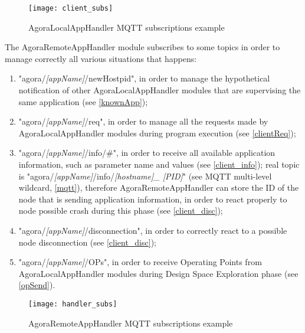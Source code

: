 \begin{figure}[H]

    \centering
    \texttt{[image: client\_subs]}
    \caption{AgoraLocalAppHandler MQTT subscriptions example}
    
\end{figure}

The AgoraRemoteAppHandler module subscribes to some topics in order to manage correctly all various situations that happens:

\begin{enumerate}

    \item "agora/\textit{[appName]}/newHostpid", in order to manage the hypothetical notification of other AgoraLocalAppHandler modules that are supervising the same application (see \ref{knownApp});
    
    \item "agora/\textit{[appName]}/req", in order to manage all the requests made by AgoraLocalAppHandler modules during program execution (see \ref{clientReq});
    
    \item "agora/\textit{[appName]}/info/\#", in order to receive all available application information, such as parameter name and values (see \ref{client_info}); real topic is "agora\slash{}\textit{[appName]}\slash{}info\slash{}\textit{[host\-name]\_ [PID]}" (see MQTT multi-level wildcard, \ref{mqtt}), therefore Agora\-Remote\-App\-Handler can store the ID of the node that is sending application information, in order to react properly to node possible crash during this phase (see \ref{client_disc});
    
    \item "agora/\textit{[appName]}/disconnection", in order to correctly react to a possible node disconnection (see \ref{client_disc});
    
    \item "agora/\textit{[appName]}/OPs", in order to receive Operating Points from AgoraLocalAppHandler modules during Design Space Exploration phase (see \ref{opSend}).

\end{enumerate}

\begin{figure}[H]

    \centering
    \texttt{[image: handler\_subs]}
    \caption{AgoraRemoteAppHandler MQTT subscriptions example}
    
\end{figure}


